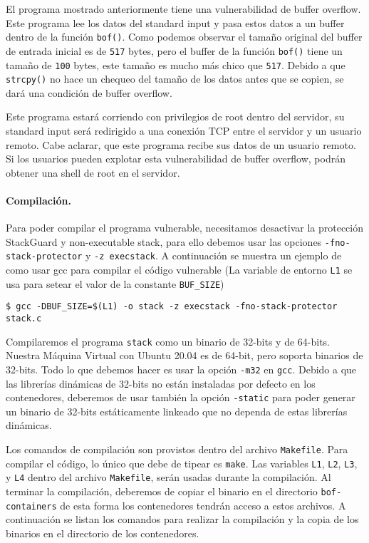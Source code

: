 El programa mostrado anteriormente tiene una vulnerabilidad de buffer overflow. Este programa lee los datos del standard input y pasa estos datos a un buffer dentro de la función {\tt bof()}. Como podemos observar el tamaño original del buffer de entrada inicial es de \texttt{517} bytes, pero el buffer de la función {\tt bof()} tiene un tamaño de \texttt{100} bytes, este tamaño es mucho más chico que \texttt{517}. Debido a que {\tt strcpy()} no hace un chequeo del tamaño de los datos antes que se copien, se dará una condición de buffer overflow.

Este programa estará corriendo con privilegios de root dentro del servidor, su standard input será redirigido a una conexión TCP entre el servidor y un usuario remoto.
Cabe aclarar, que este programa recibe sus datos de un usuario remoto.
Si los usuarios pueden explotar esta vulnerabilidad de buffer overflow, podrán obtener una shell de root en el servidor.


\paragraph{Compilación.}
Para poder compilar el programa vulnerable, necesitamos desactivar la protección StackGuard y non-executable stack, para ello debemos usar las opciones \texttt{-fno-stack-protector} y \texttt{-z execstack}.
A continuación se muestra un ejemplo de como usar gcc para compilar el código vulnerable (La variable de entorno \texttt{L1} se usa para setear el valor de la constante \texttt{BUF\_SIZE})

\begin{lstlisting}
$ gcc -DBUF_SIZE=$(L1) -o stack -z execstack -fno-stack-protector stack.c
\end{lstlisting}

Compilaremos el programa \texttt{stack} como un binario de 32-bits y de 64-bits. Nuestra Máquina Virtual con Ubuntu 20.04 es de 64-bit, pero soporta binarios de 32-bits. Todo lo que debemos hacer es usar la opción \texttt{-m32} en \texttt{gcc}.
Debido a que las librerías dinámicas de 32-bits no están instaladas por defecto en los contenedores, deberemos de usar también la opción \texttt{-static} para poder generar un binario de 32-bits estáticamente linkeado que no dependa de estas librerías dinámicas.

Los comandos de compilación son provistos dentro del archivo \texttt{Makefile}. Para compilar el código, lo único que debe de tipear es \texttt{make}. Las variables \texttt{L1}, \texttt{L2}, \texttt{L3}, y \texttt{L4} dentro del archivo \texttt{Makefile}, serán usadas durante la compilación.
Al terminar la compilación, deberemos de copiar el binario en el directorio \texttt{bof-containers} de esta forma los contenedores tendrán acceso a estos archivos. 
A continuación se listan los comandos para realizar la compilación y la copia de los binarios en el directorio de los contenedores.

